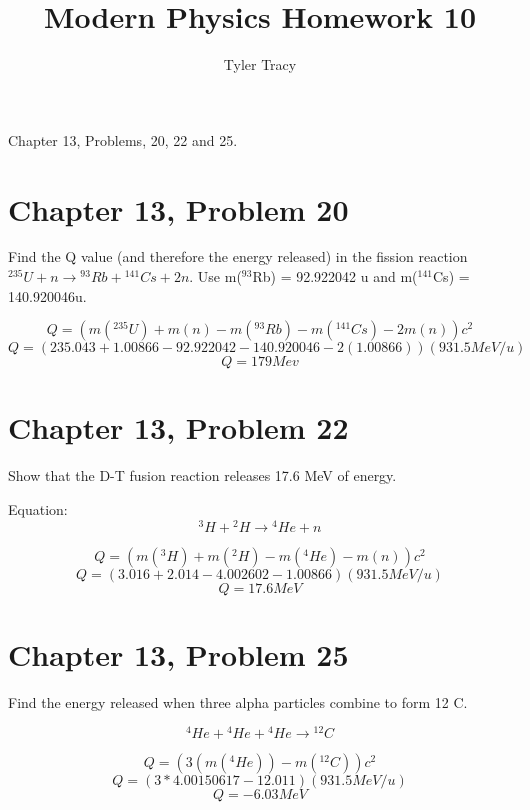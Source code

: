 \documentclass[12pt]{article}
\title{Modern Physics Homework 10}
\author{Tyler Tracy}
\begin{document}
\maketitle


Chapter 13, Problems, 20, 22 and 25.


\section*{Chapter 13, Problem 20}

Find the Q value (and therefore the energy released) in the fission reaction ${}^{235}U + n \rightarrow {}^{93}Rb + {}^{141}Cs + 2n.$ Use m(${}^{93}$Rb) = 92.922042 u and m(${}^{141}$Cs) = 140.920046u.

$$ Q = (m({}^{235}U)+ m(n) - m({}^{93}Rb) - m({}^{141}Cs) - 2m(n))c^2 $$
$$ Q = (235.043 + 1.00866 - 92.922042 - 140.920046 - 2(1.00866))(931.5 MeV/u) $$
$$ Q = 179 Mev $$


\section*{Chapter 13, Problem 22}

Show that the D-T fusion reaction releases 17.6 MeV of energy.

Equation:
$$ {}^{3}H + {}^{2}H \rightarrow {}^{4}He + n $$

$$ Q = (m({}^{3}H) + m({}^{2}H ) - m({}^{4}He ) - m(n))c^2 $$
$$ Q = (3.016 + 2.014 - 4.002602 - 1.00866)(931.5 MeV/u) $$
$$ Q = 17.6 MeV $$

\section*{Chapter 13, Problem 25}

Find the energy released when three alpha particles combine to form 12 C.

$$ {}^{4}He + {}^{4}He + {}^{4}He \rightarrow {}^{12}C $$

$$ Q = (3(m({}^4He)) - m({}^{12}C))c^2 $$
$$ Q = (3 * 4.00150617 - 12.011)(931.5 MeV/u) $$
$$ Q = - 6.03 MeV$$
\end{document}
